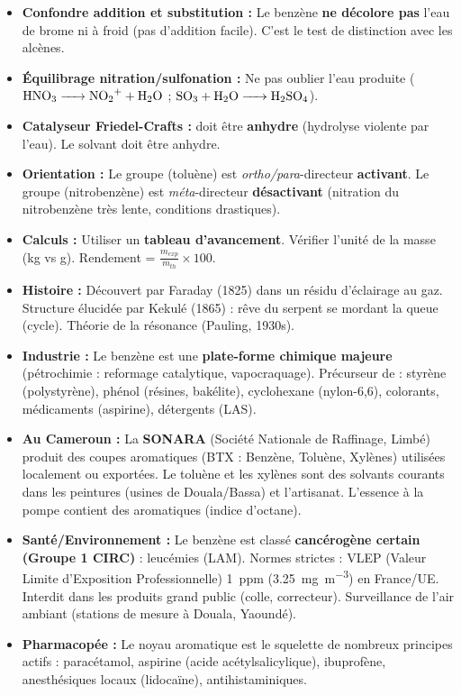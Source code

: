 \documentclass[11pt]{article}
\begin{document}
\begin{attention}
\begin{itemize}
\item \textbf{Confondre addition et substitution :} Le benzène \textbf{ne décolore pas} l'eau de brome ni  à froid (pas d'addition facile). C'est le test de distinction avec les alcènes.
\item \textbf{Équilibrage nitration/sulfonation :} Ne pas oublier l'eau produite ($\ce{HNO3 -> NO2+ + H2O}$ ; $\ce{SO3 + H2O -> H2SO4}$).
\item \textbf{Catalyseur Friedel-Crafts :}  doit être \textbf{anhydre} (hydrolyse violente par l'eau). Le solvant doit être anhydre.
\item \textbf{Orientation :} Le groupe  (toluène) est \emph{ortho/para}-directeur \textbf{activant}. Le groupe  (nitrobenzène) est \emph{méta}-directeur \textbf{désactivant} (nitration du nitrobenzène très lente, conditions drastiques).
\item \textbf{Calculs :} Utiliser un \textbf{tableau d'avancement}. Vérifier l'unité de la masse (kg vs g). Rendement = $\frac{m_{exp}}{m_{th}} \times 100$.
\end{itemize}
\end{attention}

\begin{savaistu}
\begin{itemize}
\item \textbf{Histoire :} Découvert par Faraday (1825) dans un résidu d'éclairage au gaz. Structure élucidée par Kekulé (1865) : rêve du serpent se mordant la queue (cycle). Théorie de la résonance (Pauling, 1930s).
\item \textbf{Industrie :} Le benzène est une \textbf{plate-forme chimique majeure} (pétrochimie : reformage catalytique, vapocraquage). Précurseur de : styrène (polystyrène), phénol (résines, bakélite), cyclohexane (nylon-6,6), colorants, médicaments (aspirine), détergents (LAS).
\item \textbf{Au Cameroun :} La \textbf{SONARA} (Société Nationale de Raffinage, Limbé) produit des coupes aromatiques (BTX : Benzène, Toluène, Xylènes) utilisées localement ou exportées. Le toluène et les xylènes sont des solvants courants dans les peintures (usines de Douala/Bassa) et l'artisanat. L'essence à la pompe contient des aromatiques (indice d'octane).
\item \textbf{Santé/Environnement :} Le benzène est classé \textbf{cancérogène certain (Groupe 1 CIRC)} : leucémies (LAM). Normes strictes : VLEP (Valeur Limite d'Exposition Professionnelle) \SI{1}{ppm} (\SI{3,25}{mg.m^{-3}}) en France/UE. Interdit dans les produits grand public (colle, correcteur). Surveillance de l'air ambiant (stations de mesure à Douala, Yaoundé).
\item \textbf{Pharmacopée :} Le noyau aromatique est le squelette de nombreux principes actifs : paracétamol, aspirine (acide acétylsalicylique), ibuprofène, anesthésiques locaux (lidocaïne), antihistaminiques.
\end{itemize}
\end{savaistu}
\end{document}
